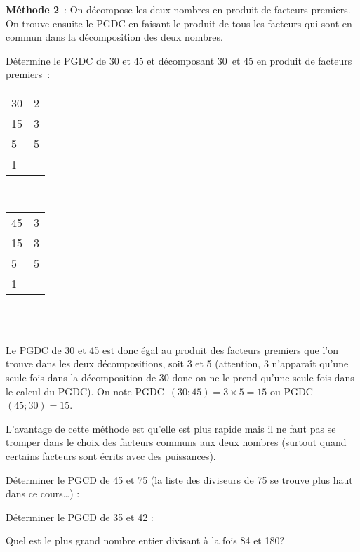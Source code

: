 \newpage

\textcolor{H1}{\textbf{Méthode 2}} : On décompose les deux nombres en produit de facteurs premiers. On trouve ensuite le PGDC en faisant le produit de tous les facteurs qui sont en commun dans la décomposition des deux nombres.


\begin{methode*1}


\begin{exemple*1}
Détermine le PGDC de 30 et 45 et décomposant 30 et 45 en produit de facteurs premiers : \\[1em]
\begin{minipage}[t]{0.26\textwidth}
 \begin{tabularx}{0.3\textwidth}{X|X}
 30 & 2 \\ 
 15 & 3 \\
 5 & 5 \\
 1 & \\ 
 \end{tabularx} \\[1em]
\end{minipage} \hfill%
\begin{minipage}[t]{0.56\textwidth}
 \begin{tabularx}{0.3\textwidth}{X|X}
 45 & 3 \\ 
 15 & 3 \\
 5 & 5 \\
 1 & \\ 
 \end{tabularx} \\[1em]
 \end{minipage} \\
Le PGDC de 30 et 45 est donc égal au produit des facteurs premiers que l'on trouve dans les deux décompositions, soit 3 et 5 (attention, 3 n’apparaît qu'une seule fois dans la décomposition de 30 donc on ne le prend qu'une seule fois dans le calcul du PGDC).
On note PGDC $(30 ; 45) = 3 \times 5 = 15$ ou PGDC $(45 ; 30) = 15$. \\[-2em]
 \end{exemple*1}

 \begin{remarque}
L'avantage de cette méthode est qu'elle est plus rapide mais il ne faut pas se tromper dans le choix des facteurs communs aux deux nombres (surtout quand certains facteurs sont écrits avec des puissances).
\end{remarque}

\exercice  
Déterminer le PGCD de 45 et 75 (la liste des diviseurs de 75 se trouve plus haut dans ce cours…) :



\exercice  
Déterminer le PGCD de 35 et 42 :



\exercice  
Quel est le plus grand nombre entier divisant à la fois 84 et 180?


 \end{methode*1}
 
